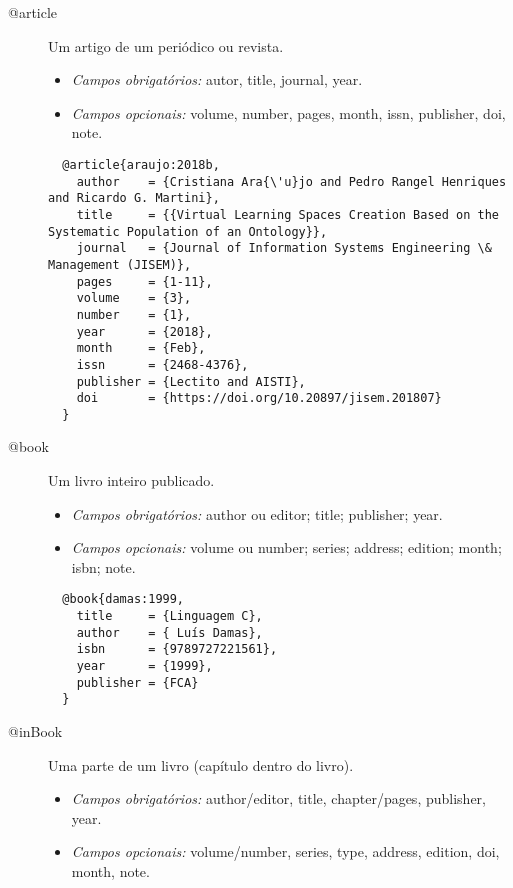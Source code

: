 \documentclass{article}%
\begin{document}
\begin{description}
  \item[@article] Um artigo de um periódico ou revista.
  \begin{itemize}
    \item \emph{Campos obrigatórios:} autor, title, journal, year.
    \item \emph{Campos opcionais:} volume, number, pages, month, issn, publisher, doi, note.
  \end{itemize}

  \begin{lstlisting}
  @article{araujo:2018b,
    author    = {Cristiana Ara{\'u}jo and Pedro Rangel Henriques and Ricardo G. Martini},
    title     = {{Virtual Learning Spaces Creation Based on the Systematic Population of an Ontology}},
    journal   = {Journal of Information Systems Engineering \& Management (JISEM)},
    pages     = {1-11},
    volume    = {3},
    number    = {1},
    year      = {2018},
    month     = {Feb},
    issn      = {2468-4376},
    publisher = {Lectito and AISTI},
    doi       = {https://doi.org/10.20897/jisem.201807}
  }
   \end{lstlisting}


  \item[@book] Um livro inteiro publicado.
  \begin{itemize}
    \item \emph{Campos obrigatórios:} author ou editor; title; publisher; year.
    \item \emph{Campos opcionais:} volume ou number; series; address; edition; month; isbn; note.
  \end{itemize}

  \begin{lstlisting}
  @book{damas:1999,
    title     = {Linguagem C},
    author    = { Luís Damas},
    isbn      = {9789727221561},
    year      = {1999},
    publisher = {FCA}
  }
  \end{lstlisting}


  \item[@inBook]  Uma parte de um livro (capítulo dentro do livro).
  \begin{itemize}
    \item \emph{Campos obrigatórios:} author/editor, title, chapter/pages, publisher, year.
    \item \emph{Campos opcionais:} volume/number, series, type, address, edition, doi, month, note.
  \end{itemize}


\end{description}
\end{document}
